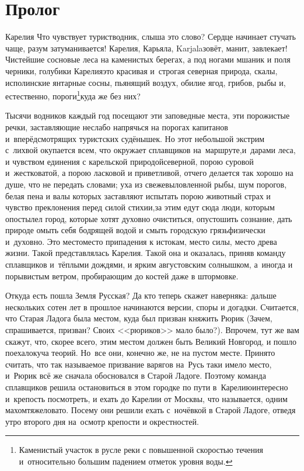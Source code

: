 {

{
\cleardoublepage
{}


\section*{Пролог}

\fancyhead[LE]{\fancyplain{}{}}
\fancyhead[RO]{\fancyplain{}{}}

Карелия\myldots{} Что чувствует турист\sdash водник, слыша это слово? Сердце начинает стучать чаще, разум затуманивается! Карелия, Карьяла, Karjala\mdash зовёт, манит, завлекает! Чистейшие сосновые леса на каменистых берегах, а под ногами мшаник и поля черники, голубики\myldots{} Карелия\mdash это красивая и~строгая северная природа, скалы, исполинские янтарные сосны, пьянящий воздух, обилие ягод, грибов, рыбы и, естественно, пороги\footnote{Каменистый участок в русле реки с повышенной скоростью течения и~относительно большим падением отметок уровня воды.}\mdash куда же без них? 

Тысячи водников каждый год посещают эти заповедные места, эти порожистые речки, заставляющие неслабо напрячься на порогах капитанов и~вперёдсмотрящих туристских судёнышек. Но этот небольшой экстрим с~лихвой окупается всем, что окружает сплавщиков на~маршруте,\mdash и~дарами леса, и чувством единения с карельской природой\mdash северной, порою суровой и~жестковатой, а порою ласковой и приветливой, отчего делается так хорошо на душе, что не передать словами; уха из свежевыловленной рыбы, шум порогов, белая пена и валы которых заставляют испытать порою животный страх и чувство преклонения перед силой стихии,\mdash за этим едут сюда люди, которым опостылел город, которые хотят духовно очиститься, опустошить сознание, дать природе омыть себя бодрящей водой и смыть городскую грязь\mdash физически и~духовно. Это место\mdash место припадения к истокам, место силы, место древа жизни. Такой представлялась Карелия. Такой она и оказалась, приняв команду сплавщиков и~тёплыми дождями, и ярким августовским солнышком, а~иногда и порывистым ветром, пробирающим до костей даже в штормовке.  

Откуда есть пошла Земля Русская? Да кто теперь скажет наверняка: дальше нескольких сотен лет в прошлое начинаются версии, споры и догадки. Считается, что Старая Ладога была местом, куда был призван княжить Рюрик (Зачем, спрашивается, призван? Своих <<рюриков>> мало было?). Впрочем, тут же вам скажут, что, скорее всего, этим местом должен быть Великий Новгород, и пошло поехало\mdash куча теорий. Но~все они, конечно же, не на пустом месте. Принято считать, что так называемое призвание варягов на~Русь таки имело место, и~Рюрик всё же сначала обосновался в Старой Ладоге. Поэтому команда сплавщиков решила остановиться в этом городке по пути в~Карелию\mdash интересно и~крепость посмотреть, и ехать до Карелии от Москвы, что называется, одним махом\mdash тяжеловато. Посему они решили ехать с~ночёвкой в Старой Ладоге, отведя утро второго дня на~осмотр крепости и окрестностей. 

}}
